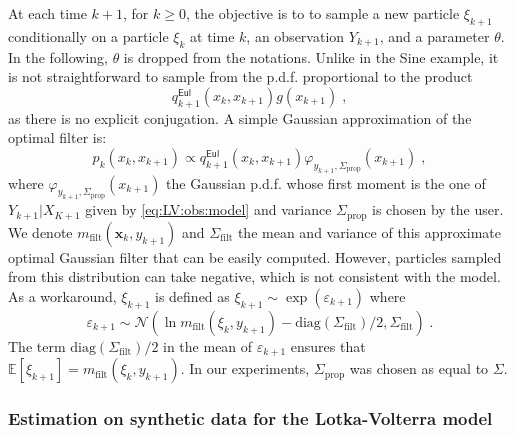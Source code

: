 \documentclass[12pt]{article}
\def\pE{\mathbb{E}}
\newcommand{\Sf}{\Sigma_{\text{filt}}}
\newcommand{\Sp}{\Sigma_{\text{prop}}}
\newcommand{\mf}{m_{\text{filt}}}
\newcommand{\eqsp}{\;}
\newcommand{\x}{\mathbf{x}}
\newcounter{example}[section]
\begin{document}
At each time ${k +1}$, for $k\geqslant 0$, the objective is to to sample a new particle $\xi_{k+1}$ conditionally on a particle $\xi_{k}$ at time $k$, an observation $Y_{k+1}$, and a parameter $\theta$. 
In the following,  $\theta$ is dropped from the notations. Unlike in the Sine example, it is not straightforward to sample from the p.d.f. proportional to the product
$$
q^{\mathsf{Eul}}_{k+1}(x_{k},x_{k+1})g(x_{k+1})\eqsp,
$$
as there is no explicit conjugation.
A simple  Gaussian approximation of the optimal filter is:
$$
p_{k}(x_{k},x_{k+1})\!\propto\! q^{\mathsf{Eul}}_{k+1}(x_{k},x_{k+1})\varphi_{y_{k+1}, \Sp}(x_{k+1})\eqsp,
$$
where $\varphi_{y_{k+1}, \Sp}(x_{k+1})$ the Gaussian p.d.f. whose first moment is the one of $Y_{k+1}\vert X_{K+1}$ given by \eqref{eq:LV:obs:model} and variance $\Sp$ is chosen by the user. We denote $ \mf(\x_{k}, y_{k+1})$ and $\Sf$ the mean and variance of this approximate optimal Gaussian filter that can be easily computed.
However, particles sampled from this distribution can take negative, which is not consistent with the model. 
As a workaround, $\xi_{k + 1}$ is defined as $\xi_{k+1} \sim\exp(\varepsilon_{k+1})$ where
$$
\varepsilon_{k+1} \sim \mathcal{N}\left(\ln \mf(\xi_{k}, y_{k+1}) - \text{diag}(\Sf)/2, \Sf\right)\eqsp .
$$
The term $\text{diag}(\Sf)/2$ in the mean of $\varepsilon_{k+1} $ ensures that $\pE\left[\xi_{k+1}\right] =  \mf(\xi_{k}, y_{k+1})$. In our experiments, $\Sp$ was chosen as equal to $\Sigma$.

\subsubsection*{Estimation on synthetic data for the Lotka-Volterra model}
\end{document}
